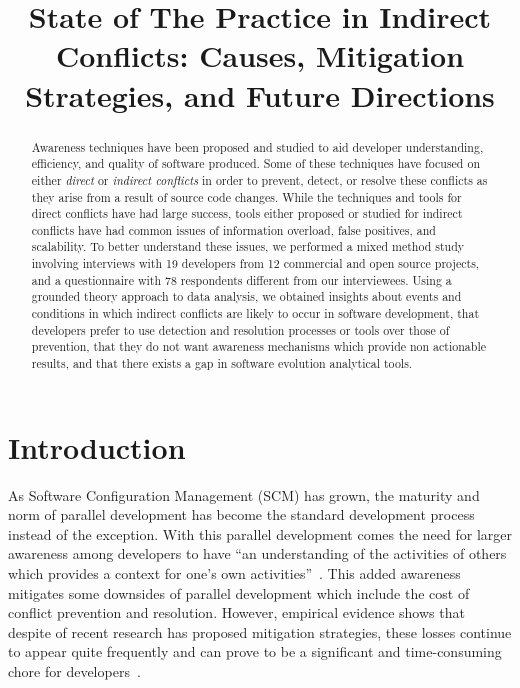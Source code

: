 \documentclass[conference]{IEEEtran}
\begin{document}
\title{State of The Practice in Indirect Conflicts: Causes, Mitigation Strategies, and Future Directions}

\author{
}

\maketitle

\begin{abstract}

Awareness techniques have been proposed and studied to aid developer
understanding, efficiency, and quality of software produced. Some of these techniques have focused
on either \textit{direct} or
\textit{indirect conflicts} in order to prevent, detect, or resolve these conflicts as they arise
from a result of source code changes. While the techniques and tools for direct conflicts have had
large success, tools either proposed or studied for indirect conflicts have had common issues of
information overload, false positives, and scalability. To better understand these issues,
we performed a mixed method study involving interviews with 19 developers from 12 commercial and open
source projects, and a questionnaire with 78 respondents different from our interviewees. Using a grounded theory approach to data analysis,
we obtained insights about events and conditions in which indirect conflicts are likely to occur in
software development, that developers prefer to use detection and resolution processes or tools
over those of prevention, that they do not want awareness mechanisms which provide non actionable results,
and that there exists a gap in software evolution analytical tools.

\end{abstract}

\section{Introduction}
\label{sec:intro}

As Software Configuration Management (SCM) has grown, the maturity and norm of parallel
development has become the standard development process instead of the exception. With this parallel development
comes the need for larger awareness among developers to have ``an understanding of the activities of others
which provides a context for one's own activities''~\cite{Dourish:1992:ACS}. This added awareness
mitigates some downsides of parallel development which include the cost of conflict prevention and resolution. However,
empirical evidence shows that despite of recent research has proposed mitigation strategies, these losses continue to appear quite frequently and can prove to be a significant
and time-consuming chore for developers~\cite{Perry:2001:PCL, Sarma:2009:TIV}.
\end{document}
